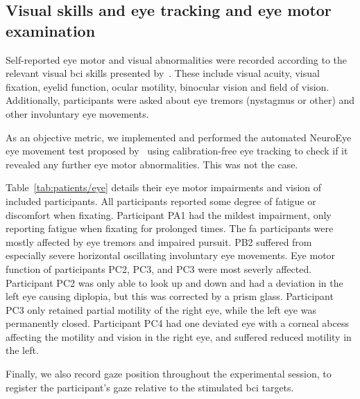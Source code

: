 \subsection{Visual skills and eye tracking and eye motor examination}

Self-reported eye motor and visual abnormalities were recorded according to the
relevant visual \ac{bci} skills presented by~\textcite{FriedOken2020}.
These include visual acuity, visual fixation, eyelid function, ocular motility,
binocular vision and field of vision.
Additionally, participants were asked about eye tremors (nystagmus or other) and
other involuntary eye movements.

As an objective metric, we implemented and performed the automated NeuroEye eye movement
test proposed by~\textcite{Hassan2022} using calibration-free eye tracking to
check if it revealed any further eye motor abnormalities.
This was not the case.

Table~\ref{tab:patients/eye} details their eye motor impairments and vision of
included participants.
All participants reported some degree of fatigue or discomfort when fixating.
Participant PA1 had the mildest impairment, only reporting fatigue when fixating
for prolonged times.
The \ac{fa} participants were mostly affected by eye tremors and impaired pursuit.
PB2 suffered from especially severe horizontal oscillating involuntary eye
movements.
Eye motor function of participants PC2, PC3, and PC3 were most severly affected.
Participant PC2 was only able to look up and down and had a deviation in the
left eye causing diplopia, but this was corrected by a prism glass.
Participant PC3 only retained partial motility of the right eye, while the left eye was permanently closed.
Participant PC4 had one deviated eye with a corneal abcess affecting the motility
and vision in the right eye, and suffered reduced motility in the left.

\begin{table}[t]
  \centering
  \footnotesize
  
  \caption[Visual skills of the included participants.]{%
  Visual skills of the included participants.
  Visual~\ac{bci} skills~\cite{FriedOken2020}
  were assessed with a combination of self-reported issues
  by the subject and the NeuroEye~\cite{Hassan2022} test. \BigCross\
  impaired, \BigDiamondshape\ severely impaired.
  logMAR: lower is better.}
  \label{tab:patients/eye}
\end{table}

Finally, we also record gaze position throughout the experimental session, to
register the participant's gaze relative to the stimulated \ac{bci} targets.

